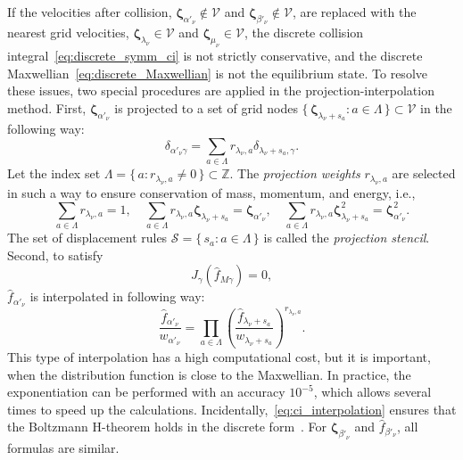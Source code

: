 \documentclass[review]{elsarticle}
\newcommand{\bzeta}{\boldsymbol{\zeta}}
\newcommand{\Set}[2]{\{\,{#1}:{#2}\,\}}
\begin{document}
If the velocities after collision,
\(\bzeta_{\alpha'_\nu}\notin\mathcal{V}\) and \(\bzeta_{\beta'_\nu}\notin\mathcal{V}\),
are replaced with the nearest grid velocities,
\(\bzeta_{\lambda_\nu}\in\mathcal{V}\) and \(\bzeta_{\mu_\nu}\in\mathcal{V}\),
the discrete collision integral~\eqref{eq:discrete_symm_ci} is not strictly conservative,
and the discrete Maxwellian~\eqref{eq:discrete_Maxwellian} is not the equilibrium state.
To resolve these issues, two special procedures are applied in the projection-interpolation method.
First, \(\bzeta_{\alpha'_\nu}\) is projected to a set of grid nodes
\(\Set{\bzeta_{\lambda_\nu+s_a}}{a\in\Lambda}\subset\mathcal{V}\) in the following way:
\begin{equation}\label{eq:ci_projection}
    \delta_{\alpha'_\nu\gamma} = \sum_{a\in\Lambda} r_{\lambda_\nu,a}\delta_{\lambda_\nu+s_a,\gamma}.
\end{equation}
Let the index set \(\Lambda = \Set{a}{r_{\lambda_\nu,a}\neq0}\subset\mathbb{Z}\).
The \emph{projection weights} \(r_{\lambda_\nu,a}\) are selected in such a way
to ensure conservation of mass, momentum, and energy, i.e.,
\begin{equation}\label{eq:stencil_conservation}
    \sum_{a\in\Lambda} r_{\lambda_\nu,a} = 1, \quad
    \sum_{a\in\Lambda} r_{\lambda_\nu,a} \bzeta_{\lambda_\nu+s_a} = \bzeta_{\alpha'_\nu}, \quad
    \sum_{a\in\Lambda} r_{\lambda_\nu,a} \bzeta_{\lambda_\nu+s_a}^2 = \bzeta_{\alpha'_\nu}^2.
\end{equation}
The set of displacement rules \(\mathcal{S} = \Set{s_a}{a\in\Lambda}\)
is called the \emph{projection stencil}.
Second, to satisfy
\begin{equation}\label{eq:strict_interpolation}
    J_\gamma\left(\hat{f}_{M\gamma}\right) = 0,
\end{equation}
\(\hat{f}_{\alpha'_\nu}\) is interpolated in following way:
\begin{equation}\label{eq:ci_interpolation}
    \frac{\hat{f}_{\alpha'_\nu}}{w_{\alpha'_\nu}} = \prod_{a\in\Lambda}
        \left(\frac{\hat{f}_{\lambda_\nu+s_a}}{w_{\lambda_\nu+s_a}} \right)^{r_{\lambda_\nu,a}}.
\end{equation}
This type of interpolation has a high computational cost, but it is important,
when the distribution function is close to the Maxwellian.
In practice, the exponentiation can be performed with an accuracy \(10^{-5}\),
which allows several times to speed up the calculations.
Incidentally,~\eqref{eq:ci_interpolation} ensures that
the Boltzmann H-theorem holds in the discrete form~\citep{Dodulad2013}.
For \(\bzeta_{\beta'_\nu}\) and \(\hat{f}_{\beta'_\nu}\), all formulas are similar.
\end{document}
